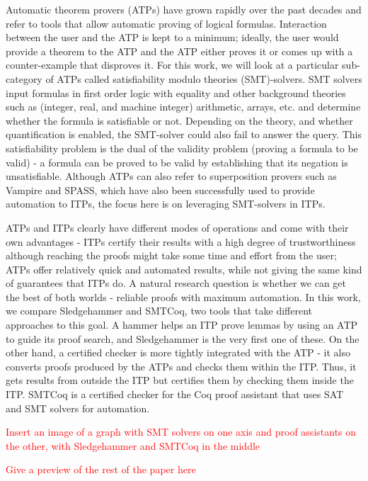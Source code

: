 \documentclass{article}
\begin{document}
	Automatic theorem provers (ATPs) have grown rapidly over the 
	past decades and refer to tools that allow automatic proving 
	of logical formulas. Interaction between the user and the 
	ATP is kept to a minimum; ideally, the user would provide a 
	theorem to the ATP and the ATP either proves it or comes up
	with a counter-example that disproves it. For this work, we 
	will look at a particular sub-category of ATPs called 
	satisfiability modulo theories (SMT)-solvers. SMT solvers 
	input formulas in first order logic with equality and 
	other background theories such as (integer, real, and 
	machine integer) arithmetic, arrays, etc. and determine
	whether the formula is satisfiable or not. Depending 
	on the theory, and whether quantification
	is enabled, the SMT-solver could also fail to answer the query. 
	This satisfiability problem is the dual of the 
	validity problem (proving a formula to be valid) - a 
	formula can be proved to be valid by establishing that 
	its negation is unsatisfiable. Although ATPs can also 
	refer to superposition provers such as Vampire and SPASS, 
	which have also been successfully used to provide 
	automation to ITPs, the focus here is on leveraging 
	SMT-solvers in ITPs.
	
	ATPs and ITPs clearly have different modes of operations
	and come with their own advantages - ITPs certify their 
	results with a high degree of trustworthiness although 
	reaching the proofs might take some time and effort from 
	the user; ATPs offer relatively quick and automated results, 
	while not giving the same kind of guarantees that ITPs do.
	A natural research question is whether we can get the best 
	of both worlds - reliable proofs with maximum automation. 
	In this work, we compare Sledgehammer and SMTCoq, 
	two tools that take different approaches 
	to this goal. A hammer helps an ITP prove lemmas by using 
	an ATP to guide its proof search, and Sledgehammer is
	the very first one of these. On the other hand, 
	a certified checker is more tightly integrated with the ATP 
	- it also converts proofs produced by the ATPs and 
	checks them within the ITP. Thus, it gets results 
	from outside the ITP but certifies them by checking them
	inside the ITP. SMTCoq is a certified checker 
	for the Coq proof assistant that uses SAT and SMT solvers
	for automation.
	
	\textcolor{red}{Insert an image of a graph with SMT solvers
	on one axis and proof assistants on the other, with
	Sledgehammer and SMTCoq in the middle}

	\textcolor{red}{Give a preview of the rest of the paper here}
\end{document}
